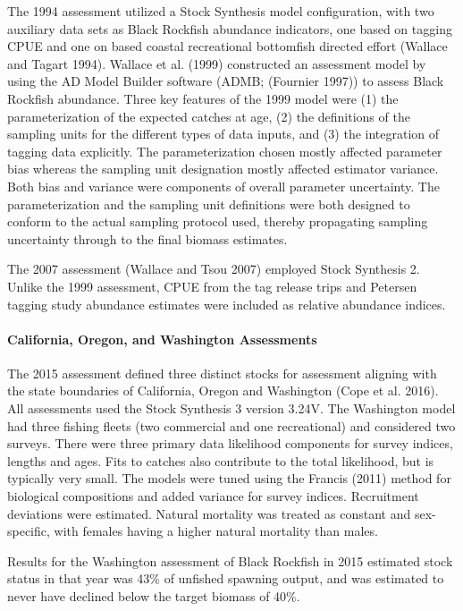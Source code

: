 \documentclass[11pt,
  english,
  letterpaper,
]{article}
\begin{document}
The 1994 assessment utilized a Stock Synthesis model configuration, with two auxiliary data sets as Black Rockfish abundance indicators, one based on tagging CPUE and one on based coastal recreational bottomfish directed effort (Wallace and Tagart 1994). Wallace et al. (1999) constructed an assessment model by using the AD Model Builder software (ADMB; (Fournier 1997)) to assess Black Rockfish abundance. Three key features of the 1999 model were (1) the parameterization of the expected catches at age, (2) the definitions of the sampling units for the different types of data inputs, and (3) the integration of tagging data explicitly. The parameterization chosen mostly affected parameter bias whereas the sampling unit designation mostly affected estimator variance. Both bias and variance were components of overall parameter uncertainty. The parameterization and the sampling unit definitions were both designed to conform to the actual sampling protocol used, thereby propagating sampling uncertainty through to the final biomass estimates.

The 2007 assessment (Wallace and Tsou 2007) employed Stock Synthesis 2. Unlike the 1999 assessment, CPUE from the tag release trips and Petersen tagging study abundance estimates were included as relative abundance indices.

\hypertarget{california-oregon-and-washington-assessments}{%
\paragraph{California, Oregon, and Washington Assessments}\label{california-oregon-and-washington-assessments}}

The 2015 assessment defined three distinct stocks for assessment aligning with the state boundaries of California, Oregon and Washington (Cope et al. 2016). All assessments used the Stock Synthesis 3 version 3.24V. The Washington model had three fishing fleets (two commercial and one recreational) and considered two surveys. There were three primary data likelihood components for survey indices, lengths and ages. Fits to catches also contribute to the total likelihood, but is typically very small. The models were tuned using the Francis (2011) method for biological compositions and added variance for survey indices. Recruitment deviations were estimated. Natural mortality was treated as constant and sex-specific, with females having a higher natural mortality than males.

Results for the Washington assessment of Black Rockfish in 2015 estimated stock status in that year was 43\% of unfished spawning output, and was estimated to never have declined below the target biomass of 40\%.
\end{document}
